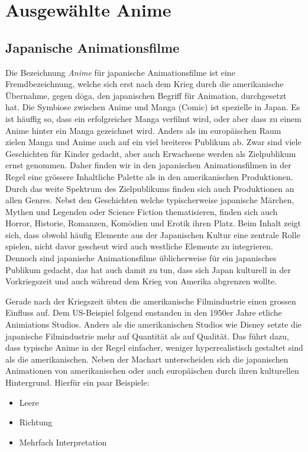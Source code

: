 \newpage
\section{Ausgewählte Anime}
\subsection{Japanische Animationsfilme}
Die Bezeichnung \emph{Anime} für japanische Animationsfilme ist eine Fremdbezeichnung, welche sich erst nach dem Krieg durch die amerikanische Übernahme, gegen d\={o}ga, den japanischen Begriff für Animation, durchgesetzt hat. Die Symbiose zwischen Anime und Manga (Comic) ist spezielle in Japan. Es ist häuffig so, dass ein erfolgreicher Manga verfilmt wird, oder aber dass zu einem Anime hinter ein Manga gezeichnet wird. Anders als im europäischen Raum zielen Manga und Anime auch auf ein viel breiteres Publikum ab. Zwar sind viele Geschichten für Kinder gedacht, aber auch Erwachsene werden als Zielpublikum ernst genommen. Daher finden wir in den japanischen Animationsfilmen in der Regel eine grössere Inhaltliche Palette als in den amerikanischen Produktionen. Durch das weite Spektrum des Zielpublikums finden sich auch Produktionen an allen Genres. Nebst den Geschichten welche typischerweise japanische Märchen, Mythen und Legenden oder Science Fiction thematisieren, finden sich auch Horror, Historie, Romanzen, Komödien und Erotik ihren Platz. Beim Inhalt zeigt sich, dass obwohl häufig Elemente aus der Japanischen Kultur eine zentrale Rolle spielen, nicht davor gescheut wird auch westliche Elemente zu integrieren. Dennoch sind japanische Animationsfilme üblicherweise für ein japanisches Publikum gedacht, das hat auch damit zu tun, dass sich Japan kulturell in der Vorkriegszeit und auch während dem Krieg von Amerika abgrenzen wollte. 

Gerade nach der Kriegszeit übten die amerikanische Filmindustrie einen grossen Einfluss auf. Dem US-Beispiel folgend enstanden in den 1950er Jahre etliche Animiations Studios. Anders als die amerikanischen Studios wie Disney setzte die japanische Filmindustrie mehr auf Quantität als auf Qualität. Das führt dazu, dass typische Anime in der Regel einfacher, weniger hyperrealistisch gestaltet sind als die amerikanischen. Neben der Machart unterscheiden sich die japanischen Animationen von amerikanischen oder auch europäischen durch ihren kulturellen Hintergrund. Hierfür ein paar Beispiele:

\begin{itemize}
	\item Leere
	\item Richtung
	\item Mehrfach Interpretation
\end{itemize}

